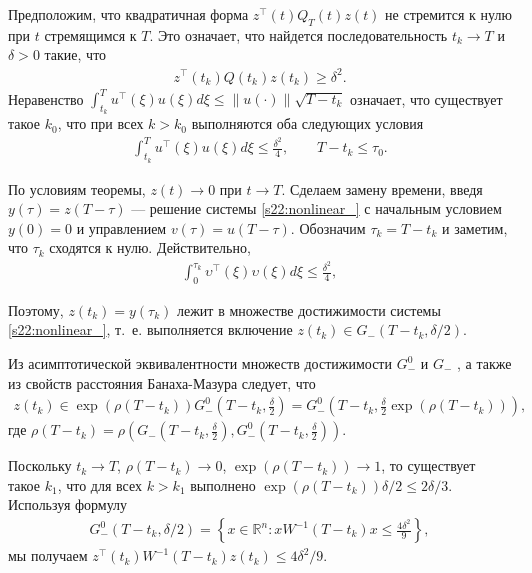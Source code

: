 \documentclass[../main.tex]{subfiles}
\begin{document}
Предположим, что квадратичная форма $z^{\top}(t)Q_T(t)z(t) $ не стремится к нулю при $t$ стремящимся к $T$.
Это означает, что найдется последовательность $ t_k \to T$ и $\delta > 0$ такие, что 
 \begin{gather}\label{s22:zqz_geq_del2}
 z^{\top}(t_k)Q(t_k)z(t_k) \geqslant \delta^2. 
 \end{gather}
Неравенство $ \int_{t_k}^{T} u^{\top}(\xi)u(\xi) d\xi \leqslant 
\|u(\cdot)\|\sqrt{T - t_k} $ означает, что существует такое $k_0$, что при всех $k > k_0$ выполняются оба следующих условия 
\begin{gather*}
 \int_{t_k}^{T} u^{\top}(\xi)u(\xi) d\xi \leqslant \frac{\delta^2}{4}, \qquad T-t_k \leqslant \tau_0.
\end{gather*}

По условиям теоремы, $z(t) \to 0 $ при $t \to T$. 
Сделаем замену времени, введя $y(\tau)=z(T-\tau)$ --- решение системы \eqref{s22:nonlinear_} с начальным условием $y(0)=0$ и управлением $ v(\tau)=u(T-\tau)$. 
Обозначим $\tau_k = T - t_k$ и заметим, что $\tau_k $ сходятся к нулю. 
Действительно, 
\begin{gather*}
 \int_{0}^{\tau_k} \upsilon^{\top}(\xi)\upsilon(\xi) 
 d\xi \leqslant \frac{\delta^2}{4},
\end{gather*}

 
Поэтому, $z(t_k) = y(\tau_k) $ лежит в множестве достижимости системы \eqref{s22:nonlinear_}, т.~е. выполняется включение $z(t_k) \in G_{-}(T-t_k,\delta/2)$.
 
 
Из асимптотической эквивалентности множеств достижимости $G_{-}^0$ и $ G_{-}$ \cite{GusevOsipovTrudy}, а также из свойств расстояния Банаха-Мазура следует, что 
\begin{gather*}
 z(t_k) \in \exp(\rho(T-t_k))G_{-}^0(T-t_k,\frac{\delta}{2})=G_{-}^0(T-t_k,\frac{\delta}{2}\exp(\rho(T-t_k))),
\end{gather*}
 где $\rho(T-t_k)=\rho(G_{-}(T-t_k,\frac{\delta}{2}),G_{-}^0(T-t_k,\frac{\delta}{2}))$.

 Поскольку $t_k \to T$, $\rho(T-t_k) \to 0$, $\exp(\rho(T-t_k)) \to 1$, то существует такое $k_1$, что для всех $k > k_1$ выполнено $\exp(\rho(T-t_k))\delta/2 \leqslant 2\delta/3$. 
Используя формулу
\begin{gather*}
G_{-}^0(T-t_k, \delta/2)=\left\{x \in \mathbb{R}^n: x W^{-1}(T-t_k) x \leqslant \frac{4\delta^2}{9} \right\}, 
\end{gather*}
мы получаем $ z^{\top}(t_k) W^{-1}(T-t_k) z(t_k) \leqslant 4\delta^2/9$.
\end{document}
